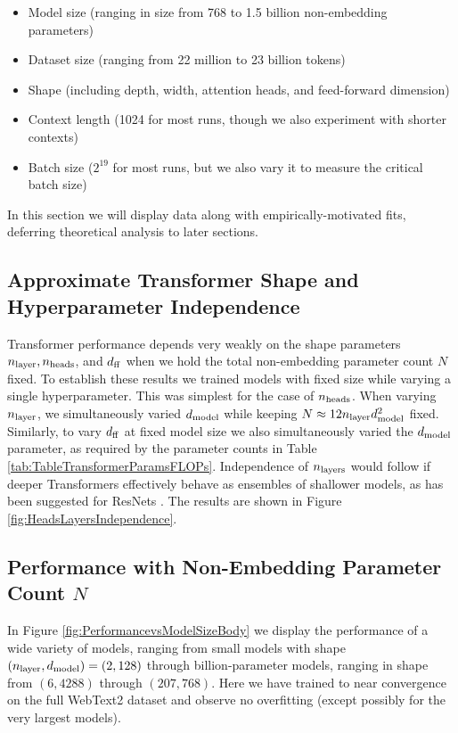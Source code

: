 \begin{itemize}
\item Model size (ranging in size from 768 to 1.5 billion non-embedding parameters) \item Dataset size (ranging from 22 million to 23 billion tokens) \item Shape (including depth, width, attention heads, and feed-forward dimension) \item Context length (1024 for most runs, though we also experiment with shorter contexts) \item Batch size ($2^{19}$ for most runs, but we also vary it to measure the critical batch size)
\end{itemize}

\endgroup In this section we will display data along with empirically-motivated fits, deferring theoretical analysis to later sections.  

\subsection{Approximate Transformer Shape and Hyperparameter Independence}
\label{sec:ShapeIndependence}

Transformer performance depends very weakly on the shape parameters $n_{\rm layer}, n_{\rm heads}$, and $d_{\rm ff}$ when we hold the total non-embedding parameter count $N$ fixed. To establish these results we  trained models with fixed size while varying a single hyperparameter. This was simplest for the case of $n_{\rm heads}$.  When varying $n_{\rm layer}$, we simultaneously varied $d_{{\rm model}}$ while keeping $N \approx 12 n_{\rm layer} d_{{\rm model}}^2$ fixed.  Similarly, to vary $d_{\rm ff}$ at fixed model size we also simultaneously varied the $d_{{\rm model}}$ parameter, as required by the parameter counts in Table \ref{tab:TableTransformerParamsFLOPs}.  Independence of $n_{\rm layers}$ would follow if deeper Transformers effectively behave as ensembles of shallower models, as has been suggested for ResNets \cite{ResNetsEnsemblesShallow}.  The results are shown in Figure \ref{fig:HeadsLayersIndependence}.

\subsection{Performance with Non-Embedding Parameter Count $N$} 
\label{sec:PerformancevsModelSize}

In Figure \ref{fig:PerformancevsModelSizeBody} we display the performance of a wide variety of models, ranging from small models with shape $(n_{\rm layer}, d_{{\rm model}}) = (2, 128)$ through billion-parameter models, ranging in shape from $(6, 4288)$ through $(207, 768)$.  Here we have trained to near convergence on the full WebText2 dataset and observe no overfitting (except possibly for the very largest models).


